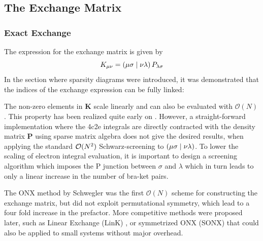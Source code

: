 \subsection{The Exchange Matrix}

\subsubsection{Exact Exchange}

The expression for the exchange matrix is given by 
\begin{equation}
K_{\mu\nu} = \left( \mu\sigma \mid \nu\lambda \right) P_{\lambda\sigma}
\end{equation}
\noindent In the section where sparsity diagrams were introduced, it was demonstrated that the indices of the exchange expression can be fully linked:
\begin{center}
\end{center}
\noindent The non-zero elements in $\mathbf{K}$ scale linearly and can also be evaluated with $\mathcal{O}(N)$. This property has been realized quite early on \cite{Sch1997}. However, a straight-forward implementation where the 4c2e integrals are directly contracted with the density matrix $\mathbf{P}$ using sparse matrix algebra does not give the desired results, when applying the standard $\mathcal{O}(N^{2})$ Schwarz-screening to $\left( \mu\sigma \mid \nu\lambda \right)$. To lower the scaling of electron integral evaluation, it is important to design a screening algorithm which imposes the P junction between $\sigma$ and $\lambda$ which in turn leads to only a linear increase in the number of bra-ket pairs. 

The ONX method by Schwegler \cite{Sch1997} was the first $\mathcal{O}(N)$ scheme for constructing the exchange matrix, but did not exploit permutational symmetry, which lead to a four fold increase in the prefactor. More competitive methods were proposed later, such as Linear Exchange (LinK) \cite{Och1998}, or symmetrized ONX (SONX) \cite{Sch2000} that could also be applied to small systems without major overhead.


